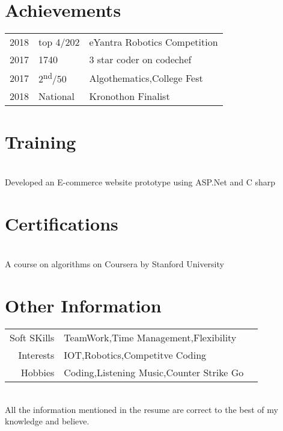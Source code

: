 \documentclass[]{resume-openfont}
\begin{document}
\begin{minipage}[t]{0.66\textwidth}

\section{Achievements} 
\begin{tabular}{rll}
2018	     & top 4/202  & eYantra Robotics Competition\\
2017	     & 1740  & 3 star coder on codechef\\
2017	     & 2\textsuperscript{nd}/50  & Algothematics,College Fest\\
2018	     & National  & Kronothon Finalist
\end{tabular}
\sectionsep
\section{Training }

\\
Developed an E-commerce website prototype using ASP.Net and C sharp
\sectionsep
\section{Certifications}
\\
A course on algorithms on Coursera by Stanford University
\sectionsep
\section{Other Information }
\begin{tabular}{rll}
Soft SKills & TeamWork,Time Management,Flexibility\\
Interests & IOT,Robotics,Competitve Coding\\
Hobbies & Coding,Listening Music,Counter Strike Go
\end{tabular}\\
All the information mentioned in the resume are correct to the best of my knowledge and believe.
\sectionsep
\end{minipage} 
\end{document}
